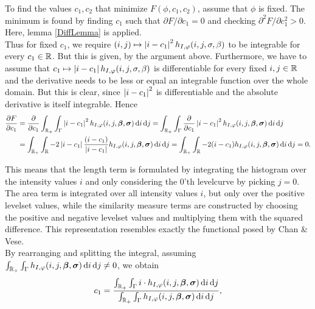 To find the values $c_1,c_2$ that minimize $F(\phi,c_1,c_2)$, assume that $\phi$ is fixed. The minimum is found by finding $c_1$ such that $\partial F/\partial c_1 =0$ and checking $\partial^2 F/\partial c_1^2 > 0$. \\
Here, lemma \ref{DiffLemma} is applied.\\
Thus for fixed $c_1$, we require $(i,j)\mapsto \left| {i-c_1} \right|^2h_{I,\varphi}(i,j,\sigma,\beta)$ to be integrable for every $c_1\in\mathbb R$. But this is given, by the argument above. Furthermore, we have to assume that  $c_1 \mapsto \left| {i-c_1} \right|h_{I,\varphi}(i,j,\sigma,\beta)$ is differentiable for every fixed $i,j\in \mathbb R$ and the derivative needs to be less or equal an integrable function over the whole domain. But this is clear, since $\left| {i-c_1} \right|^2$ is differentiable and the absolute derivative is itself integrable. Hence
\begin{equation}
  \begin{split}
    \frac{\partial F}{\partial c_1} &= \frac{\partial }{\partial c_1} \int_{\mathbb R_+}\int_{\Gamma}\left| {i-c_1} \right|^2 h_{I,\varphi}(i,j,\boldsymbol{\beta} ,\boldsymbol{\sigma} ) \,{\rm d} i\,{\rm d} j 
    = \int_{\mathbb R_+}\int_{\Gamma}\frac{\partial }{\partial c_1}\left| {i-c_1} \right|^2 h_{I,\varphi}(i,j,\boldsymbol{\beta} ,\boldsymbol{\sigma} ) \,{\rm d} i\,{\rm d} j \\
    &= \int_{\mathbb R_+} \int_\mathbb R-2\left| {i-c_1} \right|\frac{(i-c_1)}{\left| {i-c_1} \right|} h_{I,\varphi}(i,j,\boldsymbol{\beta} ,\boldsymbol{\sigma} ) \,{\rm d} i\,{\rm d} j 
    = \int_{\mathbb R_+} \int_\mathbb R-2(i-c_1) h_{I,\varphi}(i,j,\boldsymbol{\beta} ,\boldsymbol{\sigma} ) \,{\rm d} i\,{\rm d} j = 0.
  \end{split}
\end{equation}

This means that the length term is formulated by integrating the histogram over the intensity values $i$ and only considering the 0'th levelcurve by picking $j=0$. The area term is integrated over all intensity values $i$, but only over the positive levelset values, while the similarity measure terms are constructed by choosing the positive and negative levelset values and multiplying them with the squared difference. This representation resembles exactly the functional posed by Chan \& Vese.\\

By rearranging and splitting the integral, assuming $\int_{\mathbb R_+}\int_{\Gamma}h_{I,\varphi}(i,j,\boldsymbol{\beta} ,\boldsymbol{\sigma} ) \,{\rm d} i\,{\rm d} j\neq 0$, we obtain
\begin{equation}
  c_1 = \frac{\int_{\mathbb R_+}  \int_{\Gamma}i\cdot h_{I,\varphi}(i,j,\boldsymbol{\beta} ,\boldsymbol{\sigma} ) \,{\rm d} i\,{\rm d} j}{\int_{\mathbb R_+}\int_{\Gamma}h_{I,\varphi}(i,j,\boldsymbol{\beta} ,\boldsymbol{\sigma} ) \,{\rm d} i\,{\rm d} j},
\end{equation}

